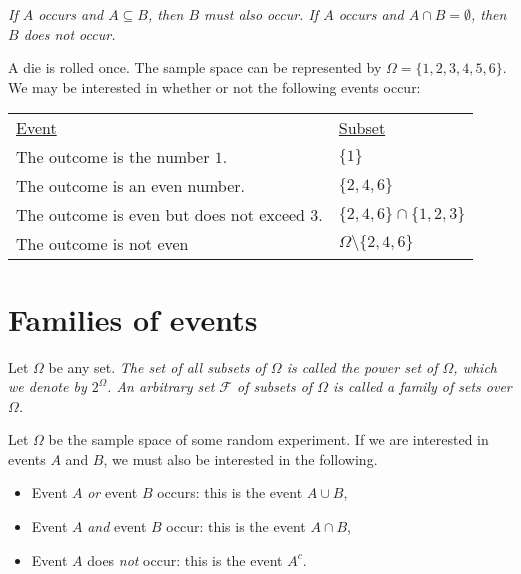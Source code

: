 \begin{remark}
\bit
\it If $A$ occurs and $A\subseteq B$, then $B$ must also occur.
\it If $A$ occurs and $A\cap B=\emptyset$, then $B$ does not occur. 
\eit
\end{remark}

\begin{example}
A die is rolled once. The sample space can be represented by $\Omega=\{1,2,3,4,5,6\}$.
We may be interested in whether or not the following events occur:
\begin{center}
\begin{tabular}{ll}
\underline{Event} & \underline{Subset} \\ 
The outcome is the number $1$.	& $\{1\}$ \\
The outcome is an even number.	& $\{2,4,6\}$ \\
The outcome is even but does not exceed $3$.	& $\{2,4,6\}\cap\{1,2,3\}$ \\
The outcome is not even			& $\Omega\setminus\{2,4,6\}$
\end{tabular}
\end{center}
\end{example}

\section{Families of events}
\begin{definition}
Let $\Omega$ be any set. 
\ben
\it The set of all subsets of $\Omega$ is called the \emph{power set} of $\Omega$, which we denote by $2^{\Omega}$.
\it An arbitrary set $\mathcal{F}$ of subsets of $\Omega$ is called a \emph{family of sets over $\Omega$}.
\een
\end{definition}

Let $\Omega$ be the sample space of some random experiment. 
If we are interested in events $A$ and $B$, we must also be interested in the following.

\begin{itemize}
\item Event $A$ \emph{or} event $B$ occurs: this is the event $A\cup B$,
\item Event $A$ \emph{and} event $B$ occur: this is the event $A\cap B$,
\item Event $A$ does \emph{not} occur: this is the event $A^c$.
\end{itemize}

